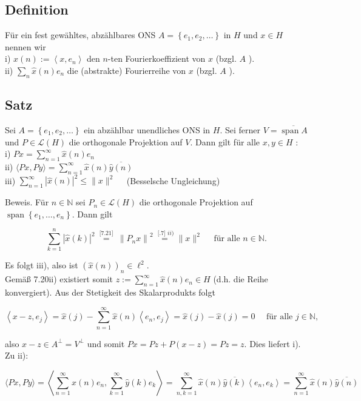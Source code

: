 \documentclass[10pt, letterpaper]{article}
\begin{document}
\subsection*{Definition}
Für ein fest gewähltes, abzählbares ONS $A=\left\{e_{1}, e_{2}, \ldots\right\}$ in $H$ und $x \in H$ nennen wir\\
i) $\hat{x}(n):=\left\langle x, e_{n}\right\rangle$ den $n$-ten Fourierkoeffizient von $x$ (bzgl. $A$ ).\\
ii) $\sum_{n} \hat{x}(n) e_{n}$ die (abstrakte) Fourierreihe von $x$ (bzgl. $A$ ).

\subsection*{Satz}
Sei $A=\left\{e_{1}, e_{2}, \ldots\right\}$ ein abzählbar unendliches ONS in $H$. Sei ferner $V=\overline{\operatorname{span} A}$ und $P \in \mathcal{L}(H)$ die orthogonale Projektion auf $V$. Dann gilt für alle $x, y \in H$ :\\
i) $P x=\sum_{n=1}^{\infty} \hat{x}(n) e_{n}$\\
ii) $\langle P x, P y\rangle=\sum_{n=1}^{\infty} \hat{x}(n) \overline{\hat{y}(n)}$\\
iii) $\sum_{n=1}^{\infty}|\hat{x}(n)|^{2} \leq\|x\|^{2} \quad$ (Besselsche Ungleichung)

Beweis. Für $n \in \mathbb{N}$ sei $P_{n} \in \mathcal{L}(H)$ die orthogonale Projektion auf $\operatorname{span}\left\{e_{1}, \ldots, e_{n}\right\}$. Dann gilt

$$
\sum_{k=1}^{n}|\hat{x}(k)|^{2} \stackrel{\text { [7.21] }}{=}\left\|P_{n} x\right\|^{2} \stackrel{\text { [.7] } i i)}{=}\|x\|^{2} \quad \text { für alle } n \in \mathbb{N} \text {. }
$$

Es folgt iii), also ist $(\hat{x}(n))_{n} \in \ell^{2}$.\\
Gemäß 7.20ii) existiert somit $z:=\sum_{n=1}^{\infty} \hat{x}(n) e_{n} \in H$ (d.h. die Reihe konvergiert). Aus der Stetigkeit des Skalarprodukts folgt

$$
\left\langle x-z, e_{j}\right\rangle=\hat{x}(j)-\sum_{n=1}^{\infty} \hat{x}(n)\left\langle e_{n}, e_{j}\right\rangle=\hat{x}(j)-\hat{x}(j)=0 \quad \text { für alle } j \in \mathbb{N},
$$

also $x-z \in A^{\perp}=V^{\perp}$ und somit $P x=P z+P(x-z)=P z=z$. Dies liefert i).\\
Zu ii):

$$
\langle P x, P y\rangle=\left\langle\sum_{n=1}^{\infty} \hat{x}(n) e_{n}, \sum_{k=1}^{\infty} \hat{y}(k) e_{k}\right\rangle=\sum_{n, k=1}^{\infty} \hat{x}(n) \overline{\hat{y}(k)}\left\langle e_{n}, e_{k}\right\rangle=\sum_{n=1}^{\infty} \hat{x}(n) \overline{\hat{y}(n)}
$$
\end{document}
